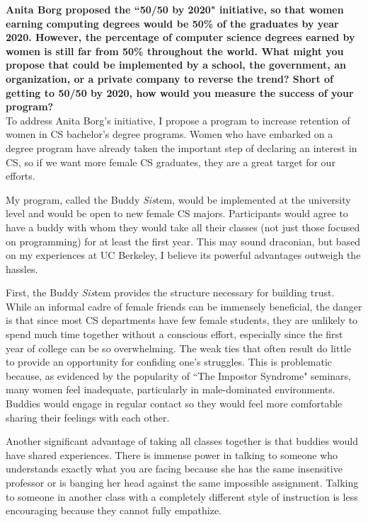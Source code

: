 \documentclass{article}
\begin{document}
	
\pagestyle{plain}

\textbf{Anita Borg proposed the ``50/50 by 2020" initiative, so that women earning computing degrees would be 50\% of the graduates by year 2020. However, the percentage of computer science degrees earned by women is still far from 50\% throughout the world.  What might you propose that could be implemented by a school, the government, an organization, or a private company to reverse the trend? Short of getting to 50/50 by 2020, how would you measure the success of your program?}\\

To address Anita Borg's initiative, I propose a program to increase retention of women in CS bachelor's degree programs.
Women who have embarked on a degree program have already taken the important step of declaring an interest in CS, so if we want more female CS graduates, they are a great target for our efforts.  %

My program, called the Buddy \textit{Sis}tem, would be implemented at the university level and would be open to new female CS majors.
Participants would agree to have a buddy with whom they would take all their classes (not just those focused on programming) for at least the first year.
This may sound draconian, but based on my experiences at UC Berkeley, I believe its powerful advantages outweigh the hassles.

First, the Buddy \textit{Sis}tem provides the structure necessary for building trust.
While an informal cadre of female friends can be immensely beneficial, the danger is that since most CS departments have few female students, they are unlikely to spend much time together without a conscious effort, especially since the first year of college can be so overwhelming.
The weak ties that often result do little to provide an opportunity for confiding one's struggles.
This is problematic because, as evidenced by the popularity of ``The Impostor Syndrome" seminars, many women feel inadequate, particularly in male-dominated environments.
Buddies would engage in regular contact so they would feel more comfortable sharing their feelings with each other.

Another significant advantage of taking all classes together is that buddies would have shared experiences.
There is immense power in talking to someone who understands exactly what you are facing because she has the same insensitive professor or is banging her head against the same impossible assignment.
Talking to someone in another class with a completely different style of instruction is less encouraging because they cannot fully empathize.
\end{document}
